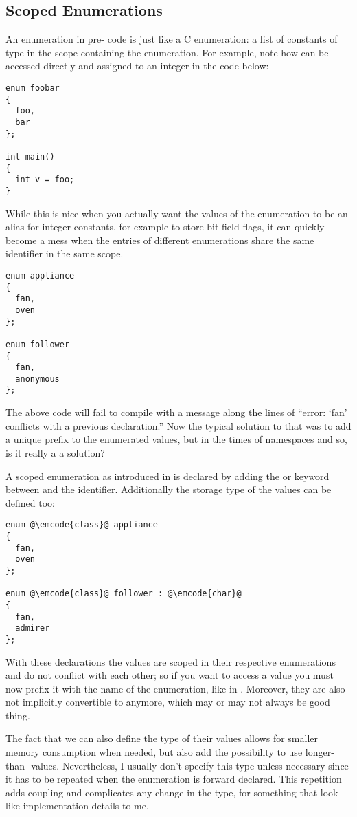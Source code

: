 \subsection{Scoped Enumerations}

An enumeration in pre- code is just like a C enumeration: a list
of constants of type  in the scope containing the
enumeration. For example, note how  can be accessed
directly and assigned to an integer in the code below:

\begin{lstlisting}
enum foobar
{
  foo,
  bar
};

int main()
{
  int v = foo;
}
\end{lstlisting}

While this is nice when you actually want the values of the
enumeration to be an alias for integer constants, for example to store
bit field flags, it can quickly become a mess when the entries of
different enumerations share the same identifier in the same scope.

\begin{lstlisting}
enum appliance
{
  fan,
  oven
};

enum follower
{
  fan,
  anonymous
};
\end{lstlisting}

The above code will fail to compile with a message along the lines of
``error: ‘fan’ conflicts with a previous declaration.'' Now the
typical solution to that was to add a unique prefix to the enumerated
values, but in the times of namespaces and so, is it really a a solution?

\bigskip

A scoped enumeration as introduced in  is declared by adding the
 or  keyword between  and the
identifier. Additionally the storage type of the values can be defined
too:

\begin{lstlisting}
enum @\emcode{class}@ appliance
{
  fan,
  oven
};

enum @\emcode{class}@ follower : @\emcode{char}@
{
  fan,
  admirer
};
\end{lstlisting}

With these declarations the values are scoped in their respective
enumerations and do not conflict with each other; so if you want to
access a value you must now prefix it with the name of the
enumeration, like in . Moreover, they are also not
implicitly convertible to  anymore, which may or may not
always be good thing.

The fact that we can also define the type of their values allows for
smaller memory consumption when needed, but also add the possibility
to use longer-than- values. Nevertheless, I usually don't
specify this type unless necessary since it has to be repeated when
the enumeration is forward declared. This repetition adds coupling and
complicates any change in the type, for something that look like
implementation details to me.

